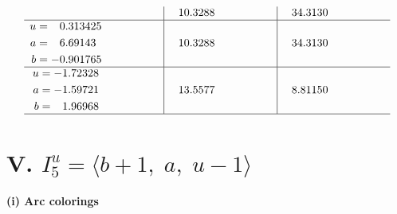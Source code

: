 \documentclass[1p]{elsarticle_modified}
\theoremstyle{definition}
\begin{document}
$$\begin{array}{c|c|c}
 & \phantom{-}10.3288\phantom{ +0.000000I} & \phantom{-}34.3130\phantom{ +0.000000I} \\ \hline\begin{aligned}
u &= \phantom{-}0.313425\phantom{ +0.000000I} \\
a &= \phantom{-}6.69143\phantom{ +0.000000I} \\
b &= -0.901765\phantom{ +0.000000I}\end{aligned}
 & \phantom{-}10.3288\phantom{ +0.000000I} & \phantom{-}34.3130\phantom{ +0.000000I} \\ \hline\begin{aligned}
u &= -1.72328\phantom{ +0.000000I} \\
a &= -1.59721\phantom{ +0.000000I} \\
b &= \phantom{-}1.96968\phantom{ +0.000000I}\end{aligned}
 & \phantom{-}13.5577\phantom{ +0.000000I} & \phantom{-}8.81150\phantom{ +0.000000I}\\
 \hline 
 \end{array}$$\newpage\newpage\renewcommand{\arraystretch}{1}
\centering \section*{V. $I^u_{5}= \langle b+1,\;a,\;u-1 \rangle$}
\flushleft \textbf{(i) Arc colorings}\\
\end{document}
